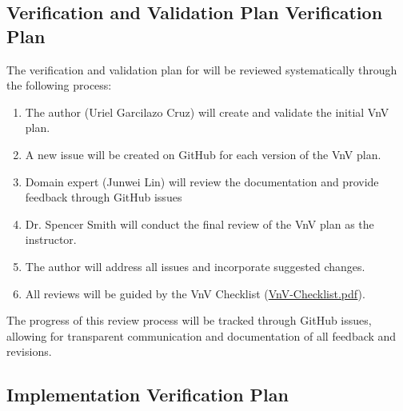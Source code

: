 \documentclass[12pt, titlepage]{article}
\begin{document}

\subsection{Verification and Validation Plan Verification Plan}


The verification and validation plan for \progname{} will be reviewed systematically through the following process:

\begin{enumerate}
  \item The author (Uriel Garcilazo Cruz) will create and validate the initial VnV plan.
  \item A new issue will be created on GitHub for each version of the VnV plan.
  \item Domain expert (Junwei Lin) will review the documentation and provide feedback through GitHub issues
  \item Dr. Spencer Smith will conduct the final review of the VnV plan as the instructor.
  \item The author will address all issues and incorporate suggested changes.
  \item All reviews will be guided by the VnV Checklist (\href{https://github.com/UGarCil/UGarcil_capstone/blob/main/docs/Checklists/VnV-Checklist.pdf}{VnV-Checklist.pdf}).
\end{enumerate}
The progress of this review process will be tracked through GitHub issues, allowing for transparent communication and documentation of all feedback and revisions.



\subsection{Implementation Verification Plan}
\end{document}

